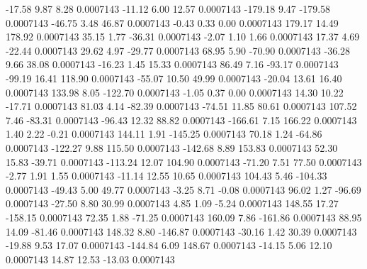      -17.58        9.87        8.28     0.0007143
      -11.12        6.00       12.57     0.0007143
     -179.18        9.47     -179.58     0.0007143
      -46.75        3.48       46.87     0.0007143
       -0.43        0.33        0.00     0.0007143
      179.17       14.49      178.92     0.0007143
       35.15        1.77      -36.31     0.0007143
       -2.07        1.10        1.66     0.0007143
       17.37        4.69      -22.44     0.0007143
       29.62        4.97      -29.77     0.0007143
       68.95        5.90      -70.90     0.0007143
      -36.28        9.66       38.08     0.0007143
      -16.23        1.45       15.33     0.0007143
       86.49        7.16      -93.17     0.0007143
      -99.19       16.41      118.90     0.0007143
      -55.07       10.50       49.99     0.0007143
      -20.04       13.61       16.40     0.0007143
      133.98        8.05     -122.70     0.0007143
       -1.05        0.37        0.00     0.0007143
       14.30       10.22      -17.71     0.0007143
       81.03        4.14      -82.39     0.0007143
      -74.51       11.85       80.61     0.0007143
      107.52        7.46      -83.31     0.0007143
      -96.43       12.32       88.82     0.0007143
     -166.61        7.15      166.22     0.0007143
        1.40        2.22       -0.21     0.0007143
      144.11        1.91     -145.25     0.0007143
       70.18        1.24      -64.86     0.0007143
     -122.27        9.88      115.50     0.0007143
     -142.68        8.89      153.83     0.0007143
       52.30       15.83      -39.71     0.0007143
     -113.24       12.07      104.90     0.0007143
      -71.20        7.51       77.50     0.0007143
       -2.77        1.91        1.55     0.0007143
      -11.14       12.55       10.65     0.0007143
      104.43        5.46     -104.33     0.0007143
      -49.43        5.00       49.77     0.0007143
       -3.25        8.71       -0.08     0.0007143
       96.02        1.27      -96.69     0.0007143
      -27.50        8.80       30.99     0.0007143
        4.85        1.09       -5.24     0.0007143
      148.55       17.27     -158.15     0.0007143
       72.35        1.88      -71.25     0.0007143
      160.09        7.86     -161.86     0.0007143
       88.95       14.09      -81.46     0.0007143
      148.32        8.80     -146.87     0.0007143
      -30.16        1.42       30.39     0.0007143
      -19.88        9.53       17.07     0.0007143
     -144.84        6.09      148.67     0.0007143
      -14.15        5.06       12.10     0.0007143
       14.87       12.53      -13.03     0.0007143

